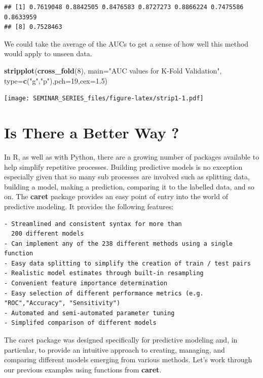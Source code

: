 \documentclass[]{book}
\newenvironment{Shaded}{\begin{snugshade}}{\end{snugshade}}
\newcommand{\KeywordTok}[1]{\textcolor[rgb]{0.13,0.29,0.53}{\textbf{#1}}}
\newcommand{\DataTypeTok}[1]{\textcolor[rgb]{0.13,0.29,0.53}{#1}}
\newcommand{\DecValTok}[1]{\textcolor[rgb]{0.00,0.00,0.81}{#1}}
\newcommand{\FloatTok}[1]{\textcolor[rgb]{0.00,0.00,0.81}{#1}}
\newcommand{\StringTok}[1]{\textcolor[rgb]{0.31,0.60,0.02}{#1}}
\newcommand{\NormalTok}[1]{#1}
\begin{document}
\begin{verbatim}
## [1] 0.7619048 0.8842505 0.8476583 0.8727273 0.8866224 0.7475586 0.8633959
## [8] 0.7528463
\end{verbatim}

We could take the average of the AUCs to get a sense of how well this
method would apply to unseen data.

\begin{Shaded}
\begin{Highlighting}[]
\KeywordTok{stripplot}\NormalTok{(}\KeywordTok{cross_fold}\NormalTok{(}\DecValTok{8}\NormalTok{),}
          \DataTypeTok{main=}\StringTok{"AUC values for K-Fold Validation"}\NormalTok{,}
          \DataTypeTok{type=}\KeywordTok{c}\NormalTok{(}\StringTok{"g"}\NormalTok{,}\StringTok{"p"}\NormalTok{),}\DataTypeTok{pch=}\DecValTok{19}\NormalTok{,}\DataTypeTok{cex=}\FloatTok{1.5}\NormalTok{)}
\end{Highlighting}
\end{Shaded}

\texttt{[image: SEMINAR\_SERIES\_files/figure-latex/strip1-1.pdf]}

\chapter{Is There a Better Way ?}\label{is-there-a-better-way}

In R, as well as with Python, there are a growing number of packages
available to help simplify repetitive processes. Building predictive
models is no exception especially given that so many sub processes are
involved such as splitting data, building a model, making a prediction,
comparing it to the labelled data, and so on. The \textbf{caret} package
provides an easy point of entry into the world of predictive modeling.
It provides the following features:

\begin{verbatim}
- Streamlined and consistent syntax for more than 
  200 different models
- Can implement any of the 238 different methods using a single function
- Easy data splitting to simplify the creation of train / test pairs
- Realistic model estimates through built-in resampling
- Convenient feature importance determination
- Easy selection of different performance metrics (e.g. "ROC","Accuracy", "Sensitivity")
- Automated and semi-automated parameter tuning
- Simplifed comparison of different models
\end{verbatim}

The caret package was designed specifically for predictive modeling and,
in particular, to provide an intuitive approach to creating, managing,
and comparing different models emerging from various methods. Let's work
through our previous examples using functions from \textbf{caret}.
\end{document}
